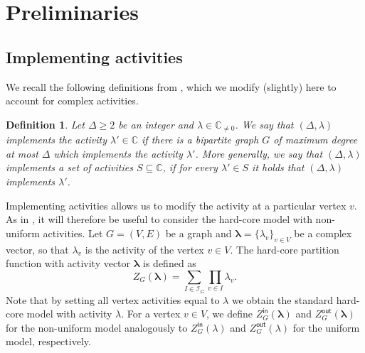 \documentclass[11pt]{article}
\newtheorem{definition}[theorem]{Definition}
\def\Zin{Z^{\mathsf{in}}}
\def\Zout{Z^{\mathsf{out}}}
\def\Complex{\mathbb{C}}
\def\Cnz{\mathbb{C}_{\neq0}}
\def\lambdab{\ensuremath{\boldsymbol{\lambda}}}
\begin{document}
\section{Preliminaries}\label{sec:prelims}
\subsection{Implementing activities}



We recall the following definitions from \cite{GGS}, which we modify (slightly) here to account for complex activities.

\begin{definition}\label{def:implement}
Let $\Delta\geq 2$ be an integer and $\lambda\in \Cnz$. We say that $(\Delta,\lambda)$ \emph{implements} the activity $\lambda'\in\Complex$ if there is a \emph{bipartite} graph $G$ of maximum degree at most  $\Delta$ which implements the activity $\lambda'$. More generally, we say that $(\Delta,\lambda)$ implements a set of activities $S\subseteq \Complex$, if for every $\lambda'\in S$ it holds that $(\Delta,\lambda)$ implements $\lambda'$.
\end{definition}





Implementing activities allows us to modify the activity at a particular vertex $v$. As in \cite{GGS}, it will therefore be useful to consider the hard-core model with non-uniform activities. Let $G=(V,E)$ be a graph and $\lambdab=\{\lambda_v\}_{v\in V}$ be a complex vector, so that $\lambda_v$ is the activity of the vertex  $v\in V$. The hard-core partition function with activity vector $\lambdab$ is defined as
\[Z_G(\lambdab)=\sum_{I\in \mathcal{I}_G}\prod_{v\in I} \lambda_v.\]
Note that by setting all vertex activities equal to $\lambda$ we obtain the standard hard-core model with activity $\lambda$.  For a vertex $v\in V$, we define $\Zin_G(\lambdab)$ and $\Zout_G(\lambdab)$ for the non-uniform model analogously to $\Zin_G(\lambda)$ and $\Zout_G(\lambda)$ for the uniform model, respectively.
\end{document}
